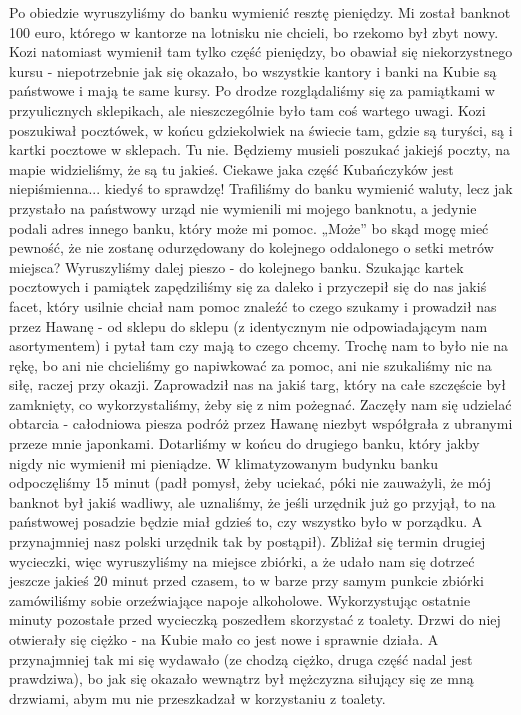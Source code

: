 Po obiedzie wyruszyliśmy do banku wymienić resztę pieniędzy. Mi został banknot 100 euro, którego w kantorze na lotnisku nie chcieli, bo rzekomo był zbyt nowy. Kozi natomiast wymienił tam tylko część pieniędzy, bo obawiał się niekorzystnego kursu - niepotrzebnie jak się okazało, bo wszystkie kantory i banki na Kubie są państwowe i mają te same kursy.
Po drodze rozglądaliśmy się za pamiątkami w przyulicznych sklepikach, ale nieszczególnie było tam coś wartego uwagi.
Kozi poszukiwał pocztówek, w końcu gdziekolwiek na świecie tam, gdzie są turyści, są i kartki pocztowe w sklepach.
Tu nie.
Będziemy musieli poszukać jakiejś poczty, na mapie widzieliśmy, że są tu jakieś.
Ciekawe jaka część Kubańczyków jest niepiśmienna...
kiedyś to sprawdzę!
Trafiliśmy do banku wymienić waluty, lecz jak przystało na państwowy urząd nie wymienili mi mojego banknotu, a jedynie podali adres innego banku, który może mi pomoc.
„Może” bo skąd mogę mieć pewność, że nie zostanę odurzędowany do kolejnego oddalonego o setki metrów miejsca?
Wyruszyliśmy dalej pieszo - do kolejnego banku.
Szukając kartek pocztowych i pamiątek zapędziliśmy się za daleko i przyczepił się do nas jakiś facet, który usilnie chciał nam pomoc znaleźć to czego szukamy i prowadził nas przez Hawanę - od sklepu do sklepu (z identycznym nie odpowiadającym nam asortymentem) i pytał tam czy mają to czego chcemy.
Trochę nam to było nie na rękę, bo ani nie chcieliśmy go napiwkować za pomoc, ani nie szukaliśmy nic na siłę, raczej przy okazji.
Zaprowadził nas na jakiś targ, który na całe szczęście był zamknięty, co wykorzystaliśmy, żeby się z nim pożegnać.
Zaczęły nam się udzielać obtarcia - całodniowa piesza podróż przez Hawanę niezbyt współgrała z ubranymi przeze mnie japonkami.
Dotarliśmy w końcu do drugiego banku, który jakby nigdy nic wymienił mi pieniądze.
W klimatyzowanym budynku banku odpoczęliśmy 15 minut (padł pomysł, żeby uciekać, póki nie zauważyli, że mój banknot był jakiś wadliwy, ale uznaliśmy, że jeśli urzędnik już go przyjął, to na państwowej posadzie będzie miał gdzieś to, czy wszystko było w porządku.
A przynajmniej nasz polski urzędnik tak by postąpił).
Zbliżał się termin drugiej wycieczki, więc wyruszyliśmy na miejsce zbiórki, a że udało nam się dotrzeć jeszcze jakieś 20 minut przed czasem, to w barze przy samym punkcie zbiórki zamówiliśmy sobie orzeźwiające napoje alkoholowe.
Wykorzystując ostatnie minuty pozostałe przed wycieczką poszedłem skorzystać z toalety.
Drzwi do niej otwierały się ciężko - na Kubie mało co jest nowe i sprawnie działa.
A przynajmniej tak mi się wydawało (ze chodzą ciężko, druga część nadal jest prawdziwa), bo jak się okazało wewnątrz był mężczyzna siłujący się ze mną drzwiami, abym mu nie przeszkadzał w korzystaniu z toalety.
